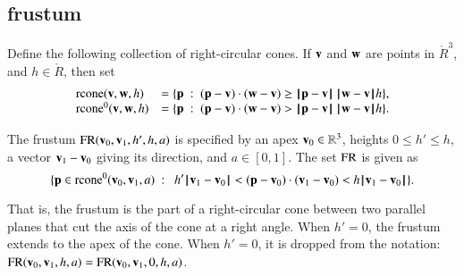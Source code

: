 \subsection{frustum}
%

\begin{definition}[rcone]
%
Define the following collection of right-circular cones.
If $\v$ and $\w$ are points in $\ring{R}^3$, and
  $h\in\ring{R}$, then set
  $$\begin{array}{lll}
    \op{rcone}(\v,\w,h) &= \{\p\mid (\p-\v)\cdot (\w-\v) \ge \norm{\p}{\v}\,\norm{\w}{\v} h\},\\
    \op{rcone}^0(\v,\w,h) &= \{\p\mid (\p-\v)\cdot (\w-\v) > \norm{\p}{\v}\,\norm{\w}{\v} h\}.\\
    \end{array}
    $$
\end{definition}
%
%
%
%


\begin{definition}[frustum, FR] The frustum
$\op{FR}(\v_0,\v_1,h',h,a)$ is specified by an apex $\v_0\in\ring{R}^3$, heights
$0\le h'\le h$, a vector $\v_1-\v_0$ giving its direction, and
$a\in[0,1]$. The set $\op{FR}$ is given as
    $$
    \{ \p \in\op{rcone}^0(\v_0,\v_1,a) \mid \ 
       h'\norm{\v_1}{\v_0} < (\p-\v_0) \cdot (\v_1-\v_0) < h\norm{\v_1}{\v_0} \}.
    $$
%
%
%
\end{definition}

That is, the frustum is the part of a right-circular cone between two
parallel planes that cut the axis of the cone at a right angle.
When $h'=0$, the frustum extends to the apex of the cone.
When $h'=0$, it is dropped from the notation: $\op{FR}(\v_0,\v_1,h,a)=\op{FR}(\v_0,\v_1,0,h,a)$.

